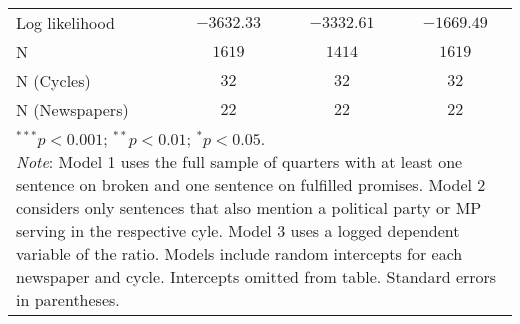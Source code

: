 \documentclass[12pt,letterpaper]{article}
\begin{document}
\begin{table}[!h]
\begin{center}
\begin{footnotesize}
\begin{tabular}{l c c c}
Log likelihood                     & $-3632.33$  & $-3332.61$   & $-1669.49$   \\
N                                  & $1619$      & $1414$       & $1619$       \\
N (Cycles)                         & $32$        & $32$         & $32$         \\
N (Newspapers)                     & $22$        & $22$         & $22$         \\
\hline
\multicolumn{4}{l}{\tiny{\parbox{.9\linewidth}{\footnotesize \vspace{2pt}$^{***}p<0.001$; $^{**}p<0.01$; $^{*}p<0.05$. \\
       \textit{Note}: Model 1 uses the full sample of quarters with at least one sentence on broken and one sentence on
       fulfilled promises.
       Model 2 considers only sentences that also mention a political party or MP serving in the respective cyle. 
       Model 3 uses a logged dependent variable of the ratio. 
       Models include random intercepts for each newspaper and cycle. Intercepts omitted from table. Standard errors in parentheses.}}}
\end{tabular}
\end{footnotesize}
\label{tab:reg_brokenfulfilld_main}
\end{center}
\end{table}
\end{document}
